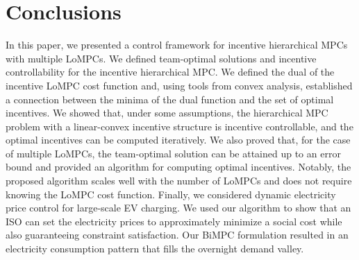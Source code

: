 \section{Conclusions}
\label{sec:conclusions}

In this paper, we presented a control framework for incentive hierarchical MPCs with multiple LoMPCs.
We defined team-optimal solutions and incentive controllability for the incentive hierarchical MPC.
We defined the dual of the incentive LoMPC cost function and, using tools from convex analysis, established a connection between the minima of the dual function and the set of optimal incentives.
We showed that, under some assumptions, the hierarchical MPC problem with a linear-convex incentive structure is incentive controllable, and the optimal incentives can be computed iteratively.
We also proved that, for the case of multiple LoMPCs, the team-optimal solution can be attained up to an error bound and provided an algorithm for computing optimal incentives.
Notably, the proposed algorithm scales well with the number of LoMPCs and does not require knowing the LoMPC cost function.
Finally, we considered dynamic electricity price control for large-scale EV charging.
We used our algorithm to show that an ISO can set the electricity prices to approximately minimize a social cost while also guaranteeing constraint satisfaction.
Our BiMPC formulation resulted in an electricity consumption pattern that fills the overnight demand valley.
